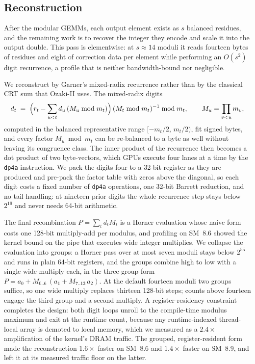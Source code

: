 \documentclass[11pt]{amsart}
\theoremstyle{plain}
\theoremstyle{definition}
\newcommand{\code}[1]{\texttt{#1}}
\begin{document}
\subsection{Reconstruction}\label{sec:recon}

After the modular GEMMs, each output element exists as $s$ balanced
residues, and the remaining work is to recover the integer they encode and
scale it into the output double. This pass is elementwise: at
$s \approx 14$ moduli it reads fourteen bytes of residues and eight of
correction data per element while performing an $O(s^2)$ digit recurrence,
a profile that is neither bandwidth-bound nor negligible.

We reconstruct by Garner's mixed-radix recurrence rather than by the
classical CRT sum that Ozaki-II uses. The mixed-radix digits
\[
  d_t \;=\; \Bigl( r_t - \sum_{u < t} d_u \,(M_u \bmod m_t) \Bigr)
  \, (M_t \bmod m_t)^{-1} \bmod m_t,
  \qquad M_u = \prod_{v<u} m_v,
\]
computed in the balanced representative range $[-m_t/2,\, m_t/2)$, fit
signed bytes, and every factor $M_u \bmod m_t$ can be
re-balanced to a byte as well without leaving its congruence class. The
inner product of the recurrence then becomes a dot product of two
byte-vectors, which GPUs execute four lanes at a time by the \code{dp4a}
instruction. We pack the digits four to a 32-bit register as they are
produced and pre-pack the factor table with zeros above the diagonal, so
each digit costs a fixed number of \code{dp4a} operations, one 32-bit
Barrett reduction, and no tail handling: at nineteen prior digits the
whole recurrence step stays below $2^{19}$ and never needs 64-bit
arithmetic.

The final recombination $P = \sum_t d_t M_t$ is a Horner evaluation whose
naive form costs one 128-bit multiply-add per modulus, and profiling on
SM~8.6 showed the kernel bound on the pipe that executes wide integer
multiplies. We collapse the evaluation into groups: a Horner pass over at
most seven moduli stays below $2^{55}$ and runs in plain 64-bit registers,
and the groups combine high to low with a single wide multiply each, in
the three-group form $P = a_0 + M_{0..6}\,(a_1 + M_{7..13}\, a_2)$. At
the default fourteen moduli two groups suffice, so one wide multiply
replaces thirteen 128-bit steps; counts above fourteen engage the third
group and a second multiply. A register-residency
constraint completes the design: both digit loops unroll to the
compile-time modulus maximum and exit at the runtime count, because any
runtime-indexed thread-local array is demoted to local memory, which we
measured as a $2.4\times$ amplification of the kernel's DRAM traffic. The
grouped, register-resident form made the reconstruction $1.6\times$ faster
on SM~8.6 and $1.4\times$ faster on SM~8.9, and left it at its measured
traffic floor on the latter.
\end{document}
